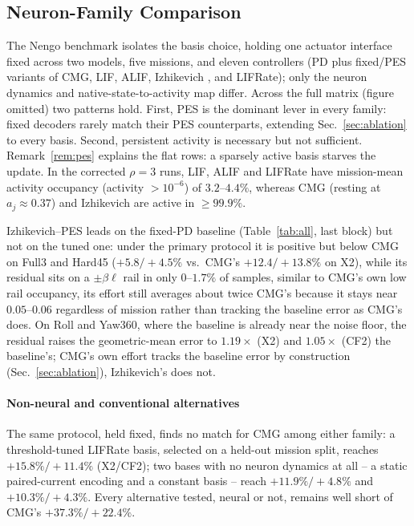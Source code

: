 \documentclass[letterpaper, 10 pt, conference]{ieeeconf}
\begin{document}
\subsection{Neuron-Family Comparison}
\label{sec:family}

The Nengo benchmark isolates the basis choice, holding one actuator interface fixed across two models, five missions, and eleven controllers (PD plus fixed/PES variants of CMG, LIF, ALIF, Izhikevich \cite{izhikevich2003}, and LIFRate); only the neuron dynamics and native-state-to-activity map differ. Across the full matrix (figure omitted) two patterns hold. First, PES is the dominant lever in every family: fixed decoders rarely match their PES counterparts, extending Sec.~\ref{sec:ablation} to every basis. Second, persistent activity is necessary but not sufficient. Remark~\ref{rem:pes} explains the flat rows: a sparsely active basis starves the update. In the corrected $\rho=3$ runs, LIF, ALIF and LIFRate have mission-mean activity occupancy (activity $>10^{-6}$) of $3.2$--$4.4\%$, whereas CMG (resting at $a_j\approx0.37$) and Izhikevich are active in ${\ge}99.9\%$.

Izhikevich--PES leads on the fixed-PD baseline (Table~\ref{tab:all}, last block) but not on the tuned one: under the primary protocol it is positive but below CMG on Full3 and Hard45 ($+5.8/+4.5\%$ vs.\ CMG's $+12.4/+13.8\%$ on X2), while its residual sits on a $\pm\beta\ell$ rail in only $0$--$1.7\%$ of samples, similar to CMG's own low rail occupancy, its effort still averages about twice CMG's because it stays near $0.05$--$0.06$ regardless of mission rather than tracking the baseline error as CMG's does. On Roll and Yaw360, where the baseline is already near the noise floor, the residual raises the geometric-mean error to $1.19\times$ (X2) and $1.05\times$ (CF2) the baseline's; CMG's own effort tracks the baseline error by construction (Sec.~\ref{sec:ablation}), Izhikevich's does not.

\paragraph{Non-neural and conventional alternatives} The same protocol, held fixed, finds no match for CMG among either family: a threshold-tuned LIFRate basis, selected on a held-out mission split, reaches $+15.8\%/+11.4\%$ (X2/CF2); two bases with no neuron dynamics at all -- a static paired-current encoding and a constant basis -- reach $+11.9\%/+4.8\%$ and $+10.3\%/+4.3\%$. Every alternative tested, neural or not, remains well short of CMG's $+37.3\%/+22.4\%$.
\end{document}
